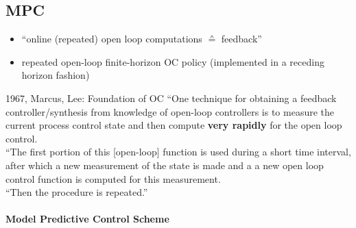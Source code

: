 \subsection{MPC}
\begin{itemize}
    \item ``online (repeated) open loop computations $\corresponds$ feedback''
    \item repeated open-loop finite-horizon OC policy
(implemented in a receding horizon fashion)
\end{itemize}

\begin{optExample}{{1967, Marcus, Lee: Foundation of OC}}
    ``One technique for obtaining a feedback controller/synthesis from knowledge of open-loop controllers is to measure the current process control state and then compute \textbf{very rapidly} for the open loop control.\\
    
    ``The first portion of this [open-loop] function is used during a short time interval, after which a new measurement of the state is made and a a new open loop control function is computed for this measurement.\\
    
    ``Then the procedure is repeated.''
\end{optExample}

\paragraph{Model Predictive Control Scheme} ~\\
\begin{figure}[H]
    \centering
\end{figure}

